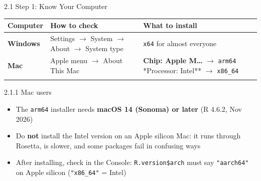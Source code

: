 \documentclass[
  ignorenonframetext,
  aspectratio=169,
]{beamer}
\newcounter{none} %
\providecommand{\tightlist}{%
  \setlength{\itemsep}{0pt}\setlength{\parskip}{0pt}}
\begin{document}
\begin{frame}[fragile]{2.1 Step 1: Know Your Computer}
\protect{}\label{sec-know-computer}
{\def\LTcaptype{none} %
\begin{longtable}[]{@{}
  >{\raggedright\arraybackslash}p{}
  >{\raggedright\arraybackslash}p{}
  >{\raggedright\arraybackslash}p{}@{}}
\toprule\noalign{}
\begin{minipage}[b]{\linewidth}\raggedright
Computer
\end{minipage} & \begin{minipage}[b]{\linewidth}\raggedright
How to check
\end{minipage} & \begin{minipage}[b]{\linewidth}\raggedright
What to install
\end{minipage} \\
\midrule\noalign{}
\endhead
\textbf{Windows} & Settings \(\rightarrow\) System \(\rightarrow\) About
\(\rightarrow\) System type & \texttt{x64} for almost everyone \\
\textbf{Mac} & Apple menu \(\rightarrow\) About This Mac & \textbf{Chip:
Apple M\ldots{}} \(\rightarrow\) \texttt{arm64} \newline **Processor:
Intel** \(\rightarrow\) \texttt{x86\_64} \\
\bottomrule\noalign{}
\end{longtable}
}

\begin{alertblock}{2.1.1 Mac users}
\protect{}\label{mac-users}
\begin{itemize}
\tightlist
\item
  The \texttt{arm64} installer needs \textbf{macOS 14 (Sonoma) or later}
  (R 4.6.2, Nov 2026)
\item
  Do \textbf{not} install the Intel version on an Apple silicon Mac: it
  runs through Rosetta, is slower, and some packages fail in confusing
  ways
\item
  After installing, check in the Console: \texttt{R.version\$arch} must
  say \texttt{"aarch64"} on Apple silicon (\texttt{"x86\_64"} = Intel)
\end{itemize}
\end{alertblock}
\end{frame}
\end{document}
